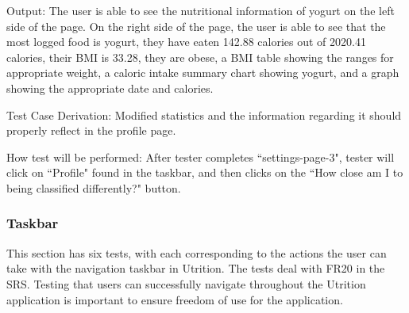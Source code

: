 \documentclass[12pt, titlepage]{article}
\begin{document}
\begin{enumerate}
		Output: The user is able to see the nutritional information of yogurt on the left side of the page. On the right side of the page, the user is able to see that the most logged food is yogurt, they have eaten 142.88 calories out of 2020.41 calories, their BMI is 33.28, they are obese, a BMI table showing the ranges for appropriate weight, a caloric intake summary chart showing yogurt, and a graph showing the appropriate date and calories.
		
		Test Case Derivation: Modified statistics and the information regarding it should properly reflect in the profile page.
		
		How test will be performed: After tester completes ``settings-page-3", tester will click on ``Profile" found in the taskbar, and then clicks on the ``How close am I to being classified differently?" button.
		
	\end{enumerate}
	
	\subsubsection{Taskbar}
	This section has six tests, with each corresponding to the actions the user can take with the navigation taskbar in Utrition. The tests deal with FR20 in the SRS. Testing that users can successfully navigate throughout the Utrition application is important to ensure freedom of use for the application.
	
\end{document}
